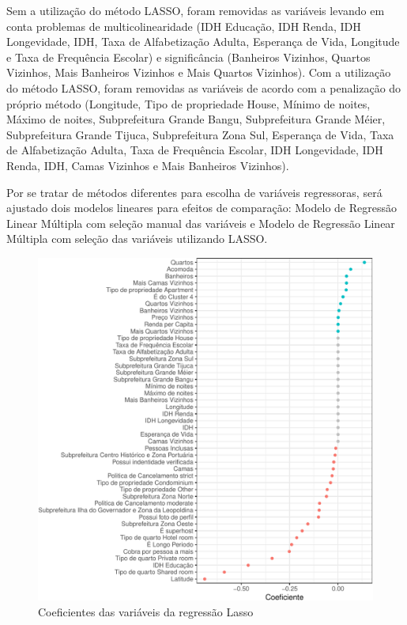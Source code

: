 \documentclass[
	12pt,				%
	a4paper,		%
	oneside,    %
	chapter=TITLE,		   %
	section=TITLE,		   %
	subsection=TITLE,	   %
	subsubsection=TITLE, %
	english,			%
	french,				%
	spanish,			%
	brazil,				%
]{abntex2}
\begin{document}
Sem a utilização do método LASSO, foram removidas as variáveis levando
em conta problemas de multicolinearidade (IDH Educação, IDH Renda, IDH
Longevidade, IDH, Taxa de Alfabetização Adulta, Esperança de Vida,
Longitude e Taxa de Frequência Escolar) e significância (Banheiros
Vizinhos, Quartos Vizinhos, Mais Banheiros Vizinhos e Mais Quartos
Vizinhos). Com a utilização do método LASSO, foram removidas as
variáveis de acordo com a penalização do próprio método (Longitude, Tipo
de propriedade House, Mínimo de noites, Máximo de noites, Subprefeitura
Grande Bangu, Subprefeitura Grande Méier, Subprefeitura Grande Tijuca,
Subprefeitura Zona Sul, Esperança de Vida, Taxa de Alfabetização Adulta,
Taxa de Frequência Escolar, IDH Longevidade, IDH Renda, IDH, Camas
Vizinhos e Mais Banheiros Vizinhos).

Por se tratar de métodos diferentes para escolha de variáveis
regressoras, será ajustado dois modelos lineares para efeitos de
comparação: Modelo de Regressão Linear Múltipla com seleção manual das
variáveis e Modelo de Regressão Linear Múltipla com seleção das
variáveis utilizando LASSO.

\begin{figure}
\centering
\includegraphics{00-TCC_files/figure-latex/significancia_lasso-1.pdf}
\caption{\label{significancia_lasso}Coeficientes das variáveis da
regressão Lasso}
\end{figure}
\end{document}
